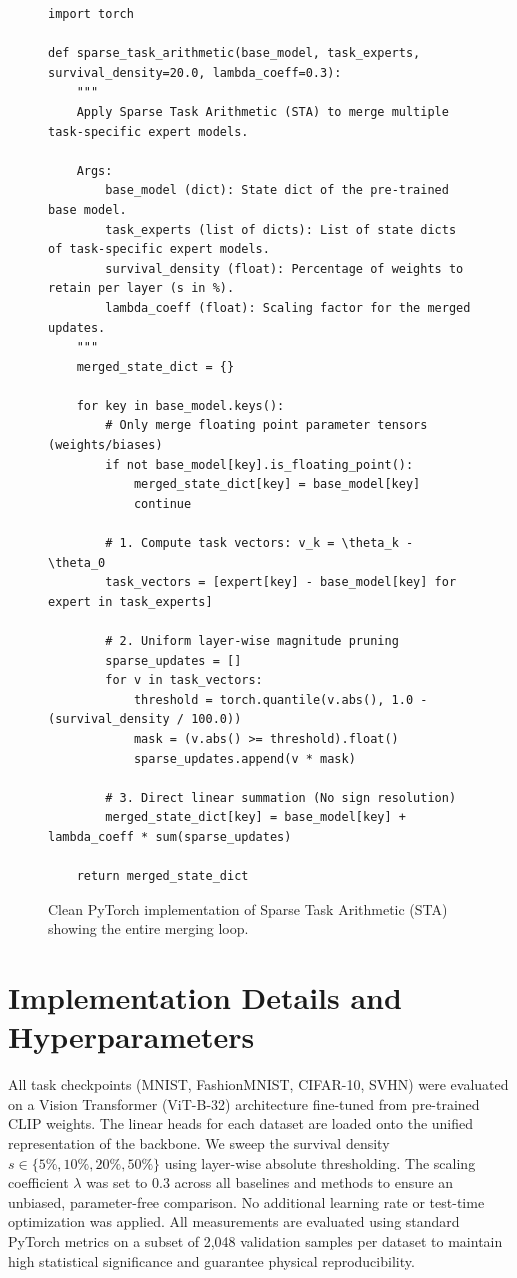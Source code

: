 \documentclass{article}
\theoremstyle{plain}
\theoremstyle{definition}
\theoremstyle{remark}
\begin{document}
\begin{figure}[h]
\begin{minipage}{\textwidth}
\begin{verbatim}
import torch

def sparse_task_arithmetic(base_model, task_experts, survival_density=20.0, lambda_coeff=0.3):
    """
    Apply Sparse Task Arithmetic (STA) to merge multiple task-specific expert models.
    
    Args:
        base_model (dict): State dict of the pre-trained base model.
        task_experts (list of dicts): List of state dicts of task-specific expert models.
        survival_density (float): Percentage of weights to retain per layer (s in %).
        lambda_coeff (float): Scaling factor for the merged updates.
    """
    merged_state_dict = {}
    
    for key in base_model.keys():
        # Only merge floating point parameter tensors (weights/biases)
        if not base_model[key].is_floating_point():
            merged_state_dict[key] = base_model[key]
            continue
            
        # 1. Compute task vectors: v_k = \theta_k - \theta_0
        task_vectors = [expert[key] - base_model[key] for expert in task_experts]
        
        # 2. Uniform layer-wise magnitude pruning
        sparse_updates = []
        for v in task_vectors:
            threshold = torch.quantile(v.abs(), 1.0 - (survival_density / 100.0))
            mask = (v.abs() >= threshold).float()
            sparse_updates.append(v * mask)
            
        # 3. Direct linear summation (No sign resolution)
        merged_state_dict[key] = base_model[key] + lambda_coeff * sum(sparse_updates)
        
    return merged_state_dict
\end{verbatim}
\caption{Clean PyTorch implementation of Sparse Task Arithmetic (STA) showing the entire merging loop.}
\label{lst:pytorch_sta}
\end{minipage}
\end{figure}

\section{Implementation Details and Hyperparameters}
All task checkpoints (MNIST, FashionMNIST, CIFAR-10, SVHN) were evaluated on a Vision Transformer (ViT-B-32) architecture fine-tuned from pre-trained CLIP weights. The linear heads for each dataset are loaded onto the unified representation of the backbone.
We sweep the survival density $s \in \{5\%, 10\%, 20\%, 50\%\}$ using layer-wise absolute thresholding. The scaling coefficient $\lambda$ was set to $0.3$ across all baselines and methods to ensure an unbiased, parameter-free comparison. No additional learning rate or test-time optimization was applied.
All measurements are evaluated using standard PyTorch metrics on a subset of 2,048 validation samples per dataset to maintain high statistical significance and guarantee physical reproducibility.

\end{document}
